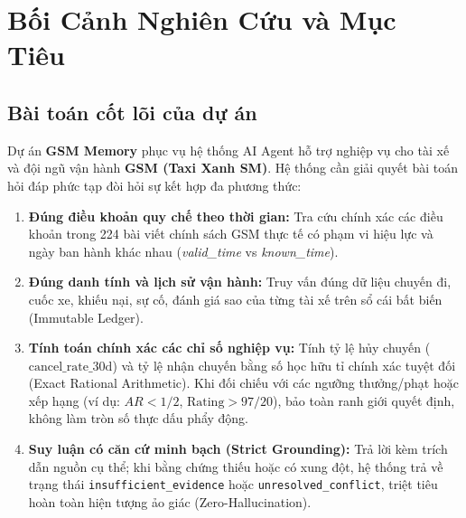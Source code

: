 \documentclass[a4paper,11pt]{article}
\begin{document}
\section{Bối Cảnh Nghiên Cứu và Mục Tiêu}

\subsection{Bài toán cốt lõi của dự án}
Dự án \textbf{GSM Memory} phục vụ hệ thống AI Agent hỗ trợ nghiệp vụ cho tài xế và đội ngũ vận hành \textbf{GSM (Taxi Xanh SM)}. Hệ thống cần giải quyết bài toán hỏi đáp phức tạp đòi hỏi sự kết hợp đa phương thức:
\begin{enumerate}[noitemsep,topsep=2pt]
    \item \textbf{Đúng điều khoản quy chế theo thời gian:} Tra cứu chính xác các điều khoản trong 224 bài viết chính sách GSM thực tế có phạm vi hiệu lực và ngày ban hành khác nhau (\textit{valid\_time} vs \textit{known\_time}).
    \item \textbf{Đúng danh tính và lịch sử vận hành:} Truy vấn đúng dữ liệu chuyến đi, cuốc xe, khiếu nại, sự cố, đánh giá sao của từng tài xế trên sổ cái bất biến (Immutable Ledger).
    \item \textbf{Tính toán chính xác các chỉ số nghiệp vụ:} Tính tỷ lệ hủy chuyến ($\text{cancel\_rate\_30d}$) và tỷ lệ nhận chuyến bằng số học hữu tỉ chính xác tuyệt đối (Exact Rational Arithmetic). Khi đối chiếu với các ngưỡng thưởng/phạt hoặc xếp hạng (ví dụ: $AR < 1/2$, $\text{Rating} > 97/20$), bảo toàn ranh giới quyết định, không làm tròn số thực dấu phẩy động.
    \item \textbf{Suy luận có căn cứ minh bạch (Strict Grounding):} Trả lời kèm trích dẫn nguồn cụ thể; khi bằng chứng thiếu hoặc có xung đột, hệ thống trả về trạng thái \nolinkurl{insufficient_evidence} hoặc \nolinkurl{unresolved_conflict}, triệt tiêu hoàn toàn hiện tượng ảo giác (Zero-Hallucination).
\end{enumerate}
\end{document}
